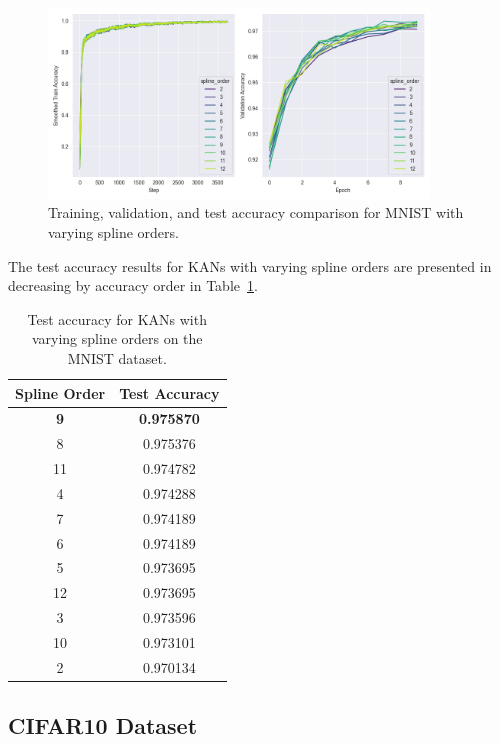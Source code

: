 \documentclass{article}
\begin{document}
\begin{figure}[H]
    \centering
    \includegraphics[width=0.9\textwidth]{pics/mnist_accuracy_spline_order}
    \caption{Training, validation, and test accuracy comparison for MNIST with varying spline orders.}
    \label{fig:mnist_accuracy_spline_order}
\end{figure}


The test accuracy results for KANs with varying spline orders are presented in decreasing by accuracy order in Table~\ref{tab:test_accuracy_spline_order}.

\begin{table}[H]
    \centering
    \caption{Test accuracy for KANs with varying spline orders on the MNIST dataset.}
    \label{tab:test_accuracy_spline_order}
    \begin{tabular}{|c|c|}
        \hline
        Spline Order & Test Accuracy \\
        \hline
        \textbf{9}           & \textbf{0.975870} \\
        8           & 0.975376 \\
        11          & 0.974782 \\
        4           & 0.974288 \\
        7           & 0.974189 \\
        6           & 0.974189 \\
        5           & 0.973695 \\
        12          & 0.973695 \\
        3           & 0.973596 \\
        10          & 0.973101 \\
        2           & 0.970134 \\
        \hline
    \end{tabular}
\end{table}



\subsection{CIFAR10 Dataset}\label{subsec:cifar10}
\end{document}
